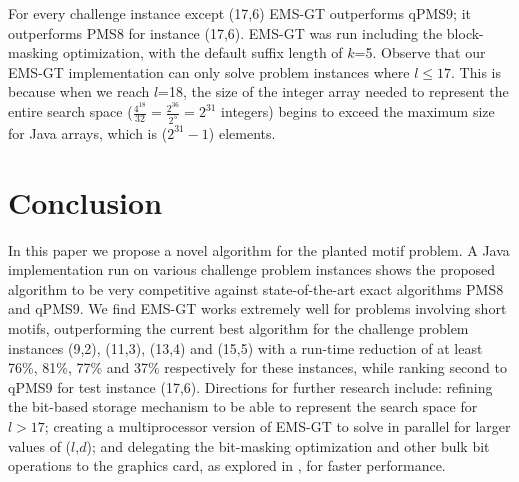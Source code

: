 \documentclass{acm_proc_article-sp}
\begin{document}
		
		For every challenge instance except (17,6) EMS-GT outperforms qPMS9; it outperforms PMS8 for instance (17,6). EMS-GT was run including the block-masking optimization, with the default suffix length of $k$=5. Observe that our EMS-GT implementation can only solve problem instances where $l \leq 17$. This is because when we reach $l$=18, the size of the integer array needed to represent the entire search space ($\frac{4^{18}}{32} = \frac{2^{36}}{2^{5}} = 2^{31}$ integers) begins to exceed the maximum size for Java arrays, which is ($2^{31} - 1$) elements.\newline





\section{Conclusion}
	In this paper we propose a novel algorithm for the planted motif problem. A Java implementation run on various challenge problem instances shows the proposed algorithm to be very competitive against state-of-the-art exact algorithms PMS8 and qPMS9. We find EMS-GT works extremely well for problems involving short motifs, outperforming the current best algorithm for the challenge problem instances (9,2), (11,3), (13,4) and (15,5) with a run-time reduction of at least 76\%, 81\%, 77\% and 37\% respectively for these instances, while ranking second to qPMS9 for test instance (17,6). Directions for further research include: refining the bit-based storage mechanism to be able to represent the search space for $l > 17$; creating a multiprocessor version of EMS-GT to solve in parallel for larger values of ($l$,$d$); and delegating the bit-masking optimization and other bulk bit operations to the graphics card, as explored in \cite{dasari2010efficient}, for faster performance.

\newpage


\end{document}
